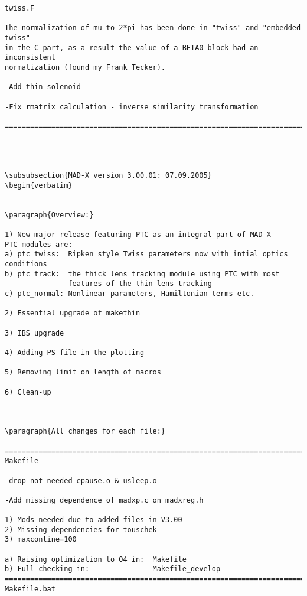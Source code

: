 \begin{verbatim}
twiss.F

The normalization of mu to 2*pi has been done in "twiss" and "embedded twiss"
in the C part, as a result the value of a BETA0 block had an inconsistent
normalization (found my Frank Tecker).

-Add thin solenoid

-Fix rmatrix calculation - inverse similarity transformation

=============================================================================




\subsubsection{MAD-X version 3.00.01: 07.09.2005}
\begin{verbatim}


\paragraph{Overview:}

1) New major release featuring PTC as an integral part of MAD-X
PTC modules are:
a) ptc_twiss:  Ripken style Twiss parameters now with intial optics conditions
b) ptc_track:  the thick lens tracking module using PTC with most
               features of the thin lens tracking
c) ptc_normal: Nonlinear parameters, Hamiltonian terms etc.

2) Essential upgrade of makethin

3) IBS upgrade

4) Adding PS file in the plotting

5) Removing limit on length of macros

6) Clean-up



\paragraph{All changes for each file:}

=============================================================================
Makefile

-drop not needed epause.o & usleep.o

-Add missing dependence of madxp.c on madxreg.h

1) Mods needed due to added files in V3.00
2) Missing dependencies for touschek
3) maxcontine=100

a) Raising optimization to O4 in:  Makefile
b) Full checking in:               Makefile_develop
=============================================================================
Makefile.bat


\end{verbatim}
